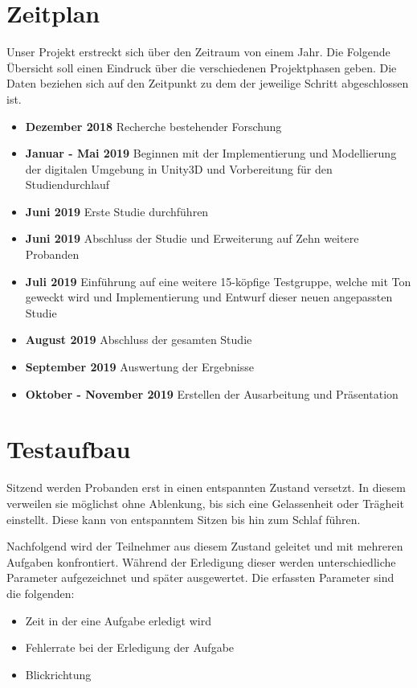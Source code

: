 \section{Zeitplan}
Unser Projekt erstreckt sich über den Zeitraum von einem Jahr. Die Folgende Übersicht soll einen Eindruck über die verschiedenen Projektphasen geben. Die Daten beziehen sich auf den Zeitpunkt zu dem der jeweilige Schritt abgeschlossen ist.

\begin{itemize}
	\item \textbf{Dezember 2018} Recherche bestehender Forschung
	\item \textbf{Januar - Mai 2019} Beginnen mit der Implementierung und Modellierung der digitalen Umgebung in Unity3D und Vorbereitung für den Studiendurchlauf
	\item \textbf{Juni 2019} Erste Studie durchführen
	\item \textbf{Juni 2019} Abschluss der Studie und Erweiterung auf Zehn weitere Probanden
	\item \textbf{Juli 2019} Einführung auf eine weitere 15-köpfige Testgruppe, welche mit Ton geweckt wird und Implementierung und Entwurf dieser neuen angepassten Studie
	\item \textbf{August 2019} Abschluss der gesamten Studie
	\item \textbf{September 2019} Auswertung der Ergebnisse
	\item \textbf{Oktober - November 2019} Erstellen der Ausarbeitung und Präsentation
\end{itemize}

\section{Testaufbau}

Sitzend werden Probanden erst in einen entspannten Zustand versetzt. In diesem verweilen sie möglichst ohne Ablenkung, bis sich eine Gelassenheit oder Trägheit einstellt. Diese kann von entspanntem Sitzen bis hin zum Schlaf führen.

Nachfolgend wird der Teilnehmer aus diesem Zustand geleitet und mit mehreren Aufgaben konfrontiert. Während der Erledigung dieser werden unterschiedliche Parameter aufgezeichnet und später ausgewertet. Die erfassten Parameter sind die folgenden:

\begin{itemize}
	\item Zeit in der eine Aufgabe erledigt wird
	\item Fehlerrate bei der Erledigung der Aufgabe
	\item Blickrichtung
\end{itemize}

